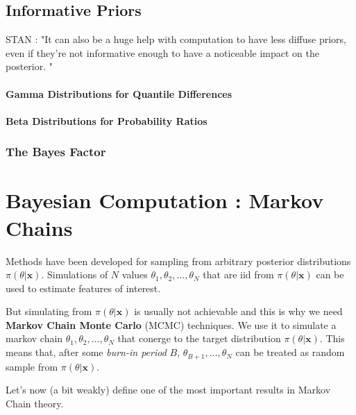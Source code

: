 \documentclass[11pt,a4paper,openany ]{book}
\begin{document}
\subsection{Informative Priors}

STAN : "It can
also be a huge help with computation to have less diffuse priors, even
if they're not informative enough to have a noticeable impact on the posterior. "

\paragraph*{Gamma Distributions for Quantile Differences}


\paragraph*{Beta Distributions for Probability Ratios}



\subsubsection*{The Bayes Factor}




\section{Bayesian Computation : Markov Chains}


Methods have been developed for sampling from arbitrary posterior distributions $\pi(\theta|\boldsymbol{x})$. Simulations of $N$ values $\theta_1,\theta_2,\dots,\theta_N$ that are iid from $\pi(\theta|\boldsymbol{x})$ can be used to estimate features of interest.

But simulating from $\pi(\theta|\boldsymbol{x})$ is usually not achievable and this is why we need \textbf{Markov Chain Monte Carlo} (MCMC) techniques. 
We use it to simulate a markov chain $\theta_1,\theta_2,\dots,\theta_N$ that conerge to the target distribution $\pi(\theta|\boldsymbol{x})$.
This means that, after some \emph{burn-in period} $B$, $\theta_{B+1},\dots,\theta_N$ can be treated as random sample from $\pi(\theta|\boldsymbol{x})$.


Let's now (a bit weakly) define one of the most important results in Markov Chain theory.
\end{document}
